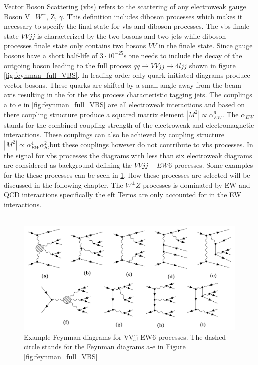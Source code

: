 \documentclass[../Bachelorarbeit.tex]{subfiles}
\begin{document}
Vector Boson Scattering (\acrshort{vbs}) refers to the scattering of any electroweak gauge Boson V=$W^{\pm}$, Z, $\gamma$. This
definition includes diboson processes which makes it necessary to specify the final state for \acrshort{vbs} and diboson processes.
The \acrshort{vbs} finale state $VVjj$ is characterized by the two bosons and two jets while diboson processes finale state only contains
two bosons $VV$ in the finale state. Since gauge bosons have a short half-life of $3 \cdot 10^{-25}$s one needs to include the
decay of the outgoing boson leading to the full process $qq\rightarrow VVjj\rightarrow 4ljj$ shown in figure \ref{fig:feynman_full_VBS}.
In leading order only quark-initiated diagrams produce vector bosons. These quarks are shifted by a small angle away from
the beam axis resulting in the for the \acrshort{vbs} process characteristic tagging jets. The couplings a to e in \ref{fig:feynman_full_VBS}
are all electroweak interactions and based on there coupling structure produce a squared matrix element
$\left\lvert M^{2} \right\rvert \propto \alpha_{EW}^{6}$. The $\alpha_{EW}$ stands for the combined coupling strength of
the electroweak and electromagnetic interactions. These couplings can also be achieved by coupling structure
$\left\lvert M^{2} \right\rvert \propto \alpha_{EW}^{4}\alpha_{S}^{2}$,but these couplings however do not contribute to \acrshort{vbs} processes.
In the signal for \acrshort{vbs} processes the diagrams with less than six electroweak diagrams are considered as background defining the $VVjj-EW6$ processes.
Some examples for the these processes can be seen in \ref{fig:EW6}. How these processes are selected will be discussed in the following chapter.
The $W^{\pm}Z$ processes is dominated by EW and QCD interactions specifically the \acrshort{eft} Terms are only accounted for in the EW interactions.\\\\
\begin{figure}[h]
    \centering
    \includegraphics[width=\textwidth]{images/EW6.png}
    \caption{Example Feynman diagrams for VVjj-EW6 processes. The dashed circle stands for the Feynman diagrams a-e in Figure \ref*{fig:feynman_full_VBS}}
    \label{fig:EW6}
\end{figure}
\end{document}
